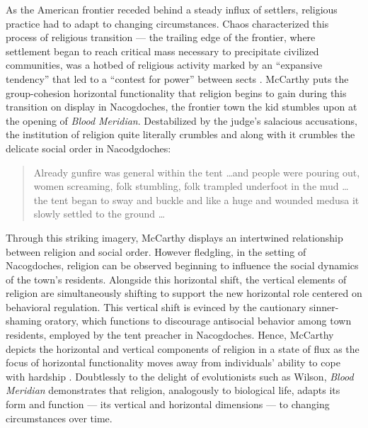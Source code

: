 As the American frontier receded behind a steady influx of settlers, religious practice had to adapt to changing circumstances.
Chaos characterized this process of religious transition --- the trailing edge of the frontier, where settlement began to reach critical mass necessary to precipitate civilized communities, was a hotbed of religious activity marked by an ``expansive tendency'' that led to a ``contest for power'' between sects \cite{Turner1894TheHistory}.
McCarthy puts the group-cohesion horizontal functionality that religion begins to gain during this transition on display in Nacogdoches, the frontier town the kid stumbles upon at the opening of \textit{Blood Meridian}.
Destabilized by the judge's salacious accusations, the institution of religion quite literally crumbles and along with it crumbles the delicate social order in Nacodgdoches:
\blockcquote[p 7]{McCarthy1992BloodWest}{
Already gunfire was general within the tent \ldots and people were pouring out, women screaming, folk stumbling, folk trampled underfoot in the mud \ldots the tent began to sway and buckle and like a huge and wounded medusa it slowly settled to the ground \ldots
}.
Through this striking imagery, McCarthy displays an intertwined relationship between religion and social order.
However fledgling, in the setting of Nacogdoches, religion can be observed beginning to influence the social dynamics of the town's residents.
Alongside this horizontal shift, the vertical elements of religion are simultaneously shifting to support the new horizontal role centered on behavioral regulation.
This vertical shift is evinced by the cautionary sinner-shaming oratory, which functions to discourage antisocial behavior among town residents, employed by the tent preacher in Nacogdoches.
Hence, McCarthy depicts the horizontal and vertical components of religion in a state of flux as the focus of horizontal functionality moves away from individuals' ability to cope with hardship \cite[p 6]{McCarthy1992BloodWest}.
Doubtlessly to the delight of evolutionists such as Wilson, \textit{Blood Meridian} demonstrates that religion, analogously to biological life, adapts its form and function --- its vertical and horizontal dimensions --- to changing circumstances over time.
